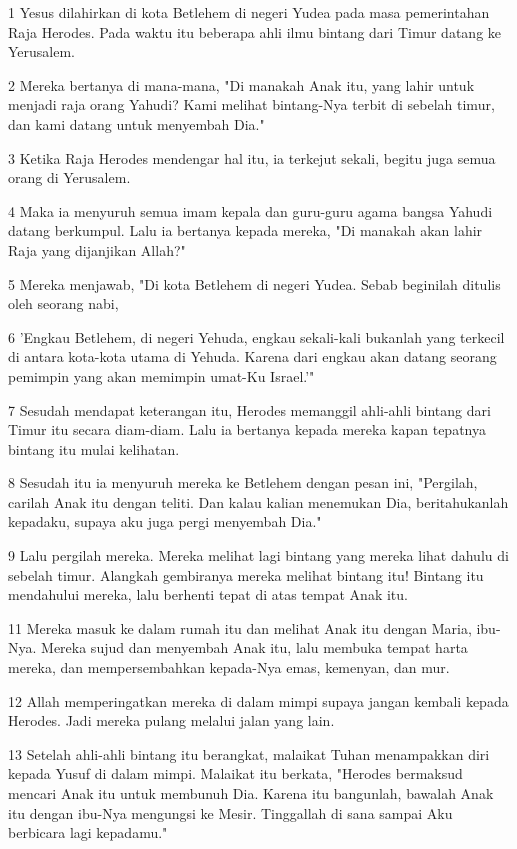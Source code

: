 \par 1 Yesus dilahirkan di kota Betlehem di negeri Yudea pada masa pemerintahan Raja Herodes. Pada waktu itu beberapa ahli ilmu bintang dari Timur datang ke Yerusalem.
\par 2 Mereka bertanya di mana-mana, "Di manakah Anak itu, yang lahir untuk menjadi raja orang Yahudi? Kami melihat bintang-Nya terbit di sebelah timur, dan kami datang untuk menyembah Dia."
\par 3 Ketika Raja Herodes mendengar hal itu, ia terkejut sekali, begitu juga semua orang di Yerusalem.
\par 4 Maka ia menyuruh semua imam kepala dan guru-guru agama bangsa Yahudi datang berkumpul. Lalu ia bertanya kepada mereka, "Di manakah akan lahir Raja yang dijanjikan Allah?"
\par 5 Mereka menjawab, "Di kota Betlehem di negeri Yudea. Sebab beginilah ditulis oleh seorang nabi,
\par 6 'Engkau Betlehem, di negeri Yehuda, engkau sekali-kali bukanlah yang terkecil di antara kota-kota utama di Yehuda. Karena dari engkau akan datang seorang pemimpin yang akan memimpin umat-Ku Israel.'"
\par 7 Sesudah mendapat keterangan itu, Herodes memanggil ahli-ahli bintang dari Timur itu secara diam-diam. Lalu ia bertanya kepada mereka kapan tepatnya bintang itu mulai kelihatan.
\par 8 Sesudah itu ia menyuruh mereka ke Betlehem dengan pesan ini, "Pergilah, carilah Anak itu dengan teliti. Dan kalau kalian menemukan Dia, beritahukanlah kepadaku, supaya aku juga pergi menyembah Dia."
\par 9 Lalu pergilah mereka. Mereka melihat lagi bintang yang mereka lihat dahulu di sebelah timur. Alangkah gembiranya mereka melihat bintang itu! Bintang itu mendahului mereka, lalu berhenti tepat di atas tempat Anak itu.
\par 11 Mereka masuk ke dalam rumah itu dan melihat Anak itu dengan Maria, ibu-Nya. Mereka sujud dan menyembah Anak itu, lalu membuka tempat harta mereka, dan mempersembahkan kepada-Nya emas, kemenyan, dan mur.
\par 12 Allah memperingatkan mereka di dalam mimpi supaya jangan kembali kepada Herodes. Jadi mereka pulang melalui jalan yang lain.
\par 13 Setelah ahli-ahli bintang itu berangkat, malaikat Tuhan menampakkan diri kepada Yusuf di dalam mimpi. Malaikat itu berkata, "Herodes bermaksud mencari Anak itu untuk membunuh Dia. Karena itu bangunlah, bawalah Anak itu dengan ibu-Nya mengungsi ke Mesir. Tinggallah di sana sampai Aku berbicara lagi kepadamu."
